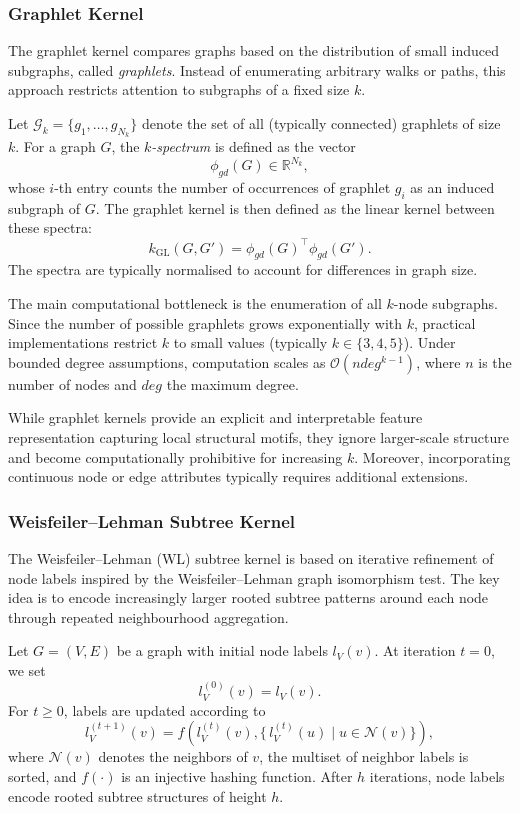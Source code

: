 \subsubsection{Graphlet Kernel}
\label{sec:theory:graphlet_kernel}

The graphlet kernel \citep{shervashidze2009efficient}
compares graphs based on the distribution of small
induced subgraphs, called \emph{graphlets}.
Instead of enumerating arbitrary walks or paths,
this approach restricts attention to subgraphs
of a fixed size $k$.

Let $\mathcal{G}_k = \{g_1, \dots, g_{N_k}\}$ denote
the set of all (typically connected) graphlets of size $k$.
For a graph $G$, the \emph{$k$-spectrum} is defined as the vector
\[
\phi_{gd}(G) \in \mathbb{R}^{N_k},
\]
whose $i$-th entry counts the number of occurrences of graphlet
$g_i$ as an induced subgraph of $G$.
The graphlet kernel is then defined as the linear kernel
between these spectra:
\[
k_{\mathrm{GL}}(G,G')
=
\phi_{gd}(G)^\top \phi_{gd}(G').
\]
The spectra are typically normalised to account for
differences in graph size.

The main computational bottleneck is the enumeration
of all $k$-node subgraphs.
Since the number of possible graphlets grows
exponentially with $k$, practical implementations
restrict $k$ to small values (typically $k \in \{3,4,5\}$).
Under bounded degree assumptions, computation
scales as $\mathcal{O}(n deg^{k-1})$,
where $n$ is the number of nodes and $deg$ the maximum degree.

While graphlet kernels provide an explicit and
interpretable feature representation capturing
local structural motifs, they ignore larger-scale
structure and become computationally prohibitive
for increasing $k$.
Moreover, incorporating continuous node or edge
attributes typically requires additional extensions.
\subsubsection{Weisfeiler--Lehman Subtree Kernel}
\label{sec:theory:wl_subtree}

The Weisfeiler--Lehman (WL) subtree kernel
\citep{shervashidze2011weisfeiler}
is based on iterative refinement of node labels
inspired by the Weisfeiler--Lehman graph isomorphism test.
The key idea is to encode increasingly larger
rooted subtree patterns around each node through
repeated neighbourhood aggregation.

Let $G=(V,E)$ be a graph with initial node labels
$l_V(v)$.
At iteration $t=0$, we set
\[
l_V^{(0)}(v) = l_V(v).
\]
For $t \ge 0$, labels are updated according to
\[
l_V^{(t+1)}(v)
=
f\!\left(
l_V^{(t)}(v),
\big\{\, l_V^{(t)}(u) \mid u \in \mathcal{N}(v) \big\}
\right),
\]
where $\mathcal{N}(v)$ denotes the neighbors of $v$,
the multiset of neighbor labels is sorted,
and $f(\cdot)$ is an injective hashing function.
After $h$ iterations, node labels encode
rooted subtree structures of height $h$.

